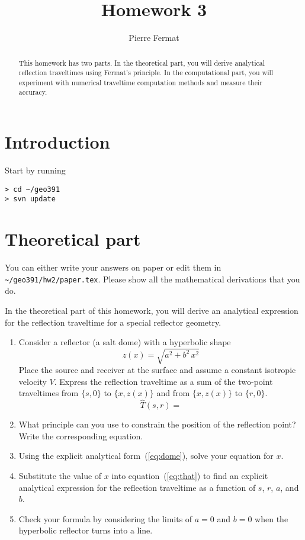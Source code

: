 \author{Pierre Fermat}
\title{Homework 3}

\begin{abstract}
This homework has two parts. In the theoretical part, you will derive
analytical reflection traveltimes using Fermat's principle. In the
computational part, you will experiment with numerical traveltime
computation methods and measure their accuracy.
\end{abstract}


\section{Introduction}

Start by running
\begin{verbatim}
> cd ~/geo391
> svn update
\end{verbatim}

\section{Theoretical part}

You can either write your answers on paper or edit them in
\verb#~/geo391/hw2/paper.tex#. Please show all the mathematical
derivations that you do.

In the theoretical part of this homework, you will derive an
analytical expression for the reflection traveltime for a special
reflector geometry. 

\begin{enumerate}
\item Consider a reflector (a salt dome) with a hyperbolic shape
\begin{equation}
  \label{eq:dome}
  z(x) = \sqrt{a^2 + b^2\,x^2}
\end{equation}
Place the source and receiver at the surface and assume a constant
isotropic velocity $V$. Express the reflection traveltime as a sum of
the two-point traveltimes from $\{s,0\}$ to $\{x,z(x)\}$ and from
$\{x,z(x)\}$ to $\{r,0\}$.
\begin{equation}
  \label{eq:that}
  \widehat{T}(s,r) = 
\end{equation}

\item What principle can you use to constrain the position of the
  reflection point? Write the corresponding equation.

\item Using the explicit analytical form~(\ref{eq:dome}), solve your
  equation for $x$.

\item Substitute the value of $x$ into equation~(\ref{eq:that}) to find
  an explicit analytical expression for the reflection traveltime as a
  function of $s$, $r$, $a$, and $b$.

\item Check your formula by considering the limits of $a=0$ and $b=0$ when the
  hyperbolic reflector turns into a line.
\end{enumerate}

